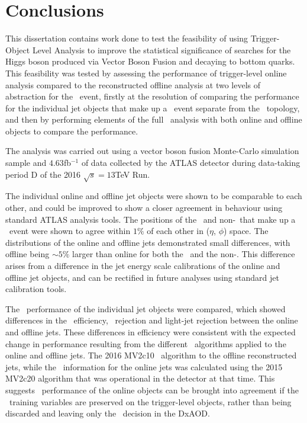 \chapter{Conclusions}
\label{c:c}

This dissertation contains work done to test the feasibility of using Trigger-Object Level Analysis to improve the statistical significance of searches for the Higgs boson produced via Vector Boson Fusion and decaying to bottom quarks. This feasibility was tested by assessing the performance of trigger-level online analysis compared to the reconstructed offline analysis at two levels of abstraction for the \VBFHBB\ event, firstly at the resolution of comparing the performance for the individual jet objects that make up a \VBFHBB\ event separate from the \VBFHBB\ topology, and then by performing elements of the full \VBFHBB\ analysis with both online and offline objects to compare the performance.

The analysis was carried out using a vector boson fusion Monte-Carlo simulation sample and $4.63$fb$^{-1}$ of data collected by the ATLAS detector during data-taking period D of the 2016 $\sqrt{s}=13$TeV Run.

The individual online and offline jet objects were shown to be comparable to each other, and could be improved to show a closer agreement in behaviour using standard ATLAS analysis tools. The positions of the \bjets\ and non-\bjets\ that make up a \VBFHBB\ event were shown to agree within $1\%$ of each other in ($\eta$, $\phi$) space. The \pt distributions of the online and offline jets demonstrated small differences, with offline \pt being $\sim5\%$ larger than online \pt for both the \bjets\ and the non-\bjets. This \pt difference arises from a difference in the jet energy scale calibrations of the online and offline jet objects, and can be rectified in future analyses using standard jet calibration tools.

The \btag\ performance of the individual jet objects were compared, which showed differences in the \btag\ efficiency, \cjet\ rejection and light-jet rejection between the online and offline jets. These differences in efficiency were consistent with the expected change in performance  resulting from the different \btag\ algorithms applied to the online and offline jets. The 2016 MV2c10 \btag\ algorithm to the offline reconstructed jets, while the \btag\ information for the online jets was calculated using the 2015 MV2c20 algorithm that was operational in the detector at that time. This suggests \btag\ performance of the online objects can be brought into agreement if the \btag\ training variables are preserved on the trigger-level objects, rather than being discarded and leaving only the \btag\ decision in the DxAOD.

